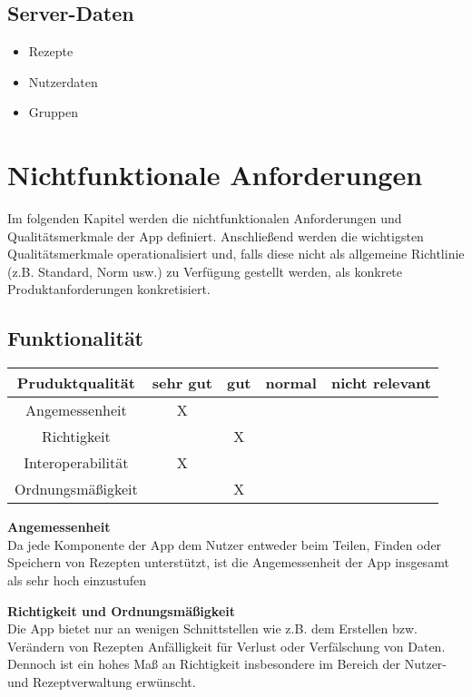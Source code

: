 \documentclass[parskip=full]{scrartcl}
\newcommand{\changelocaltocdepth}[1]{%
  \addtocontents{toc}{\protect\setcounter{tocdepth}{#1}}%
  \setcounter{tocdepth}{#1}%
}
\newcommand{\resetSubSectionNumbering}{
    \renewcommand{\thesubsection}{\arabic{section}.\arabic{subsection}}
    \changelocaltocdepth{3} 
}
\begin{document}
\subsection{Server-Daten}
\begin{itemize}
    \item Rezepte
    \item Nutzerdaten
    \item Gruppen
\end{itemize}

\resetSubSectionNumbering
\section{Nichtfunktionale Anforderungen}
Im folgenden Kapitel werden die nichtfunktionalen Anforderungen und Qualitätsmerkmale der App definiert.
Anschließend werden die wichtigsten Qualitätsmerkmale operationalisiert und, falls diese nicht als allgemeine Richtlinie (z.B. Standard, Norm usw.) zu Verfügung gestellt werden,
als konkrete Produktanforderungen konkretisiert.

\subsection{Funktionalität}
\begin{tabular}{| c | c | c | c | c |}
    \hline
    \textbf{Pruduktqualität} & \textbf{sehr gut} & \textbf{gut} & \textbf{normal} & \textbf{nicht relevant} \\ \hline
    Angemessenheit           & X                 &              &                 &                         \\ \hline
    Richtigkeit              &                   & X            &                 &                         \\ \hline
    Interoperabilität        & X                 &              &                 &                         \\ \hline
    Ordnungsmäßigkeit        &                   & X            &                 &                         \\ \hline
\end{tabular}

\textbf{Angemessenheit}\\
Da jede Komponente der App dem Nutzer entweder beim Teilen, Finden oder Speichern von Rezepten unterstützt, ist die Angemessenheit der App insgesamt als sehr hoch einzustufen

\textbf{Richtigkeit und Ordnungsmäßigkeit}\\
Die App bietet nur an wenigen Schnittstellen wie z.B. dem Erstellen bzw. Verändern von Rezepten Anfälligkeit für Verlust oder Verfälschung von Daten. Dennoch ist ein hohes Maß an Richtigkeit insbesondere im Bereich der Nutzer- und Rezeptverwaltung erwünscht.
\end{document}
